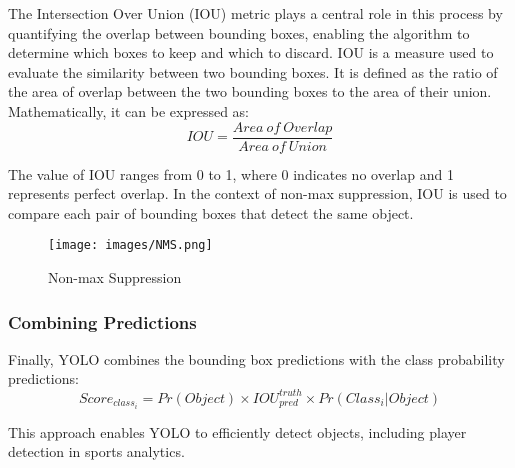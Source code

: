 \documentclass[12pt, letterpaper]{article}
\begin{document}
{\begin{spacing}{1.2}
The Intersection Over Union (IOU) metric plays a central role in this process by quantifying the overlap between bounding boxes, enabling the algorithm to determine which boxes to keep and which to discard. IOU is a measure used to evaluate the similarity between two bounding boxes. It is defined as the ratio of the area of overlap between the two bounding boxes to the area of their union. Mathematically, it can be expressed as:
\begin{equation*}
    IOU = \frac{Area\: of\: Overlap}{Area\: of\: Union}
\end{equation*}

The value of IOU ranges from 0 to 1, where 0 indicates no overlap and 1 represents perfect overlap. In the context of non-max suppression, IOU is used to compare each pair of bounding boxes that detect the same object.

\begin{figure}[htbp]
\centering
\texttt{[image: images/NMS.png]}
\captionsetup{font=large}
\caption{Non-max Suppression}
\label{fig:NMS}
\end{figure}


\subsubsection{Combining Predictions}
Finally, YOLO combines the bounding box predictions with the class probability predictions:
\begin{equation*}
    Score_{class_i} = Pr(Object) \times IOU_{pred}^{truth} \times Pr(Class_i | Object)
\end{equation*}

This approach enables YOLO to efficiently detect objects, including player detection in sports analytics.

\end{spacing}
}
\end{document}
